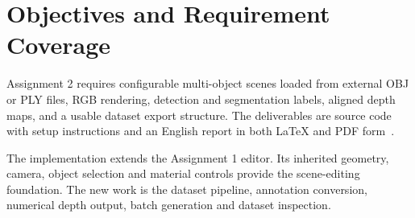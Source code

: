 \documentclass[12pt,a4paper]{article}
\begin{document}
\begin{abstract}
This report describes a C++17 synthetic dataset generator built on a custom OpenGL 3.3 Core and GLSL rendering pipeline. An interactive editor imports OBJ meshes and configures object transforms, materials, lighting and camera pose. The exporter captures aligned RGB images, exact instance identifiers, visible-instance masks, bounding boxes and numerical camera-forward depth. Detection labels are exported in both COCO JSON and YOLO TXT formats; COCO also provides compressed run-length instance segmentation. Seeded batch generation varies scene properties from a fixed base scene and stores replayable scene files. An export dialog renders a preview in memory, while a dataset viewer opens saved samples and reports numerical depth under the cursor. This report explains the architecture, coordinate conventions, annotation algorithms, user workflow, verification results and implementation limits. The reported examples contain eight images, forty visible-object annotations and four categories. No learning-based depth estimation or black-box dataset generator is used.
\end{abstract}
\tableofcontents\clearpage{}

\section{Objectives and Requirement Coverage}
Assignment 2 requires configurable multi-object scenes loaded from external OBJ or PLY files, RGB rendering, detection and segmentation labels, aligned depth maps, and a usable dataset export structure. The deliverables are source code with setup instructions and an English report in both LaTeX and PDF form~\cite{assignment}.

The implementation extends the Assignment 1 editor. Its inherited geometry, camera, object selection and material controls provide the scene-editing foundation. The new work is the dataset pipeline, annotation conversion, numerical depth output, batch generation and dataset inspection.
\end{document}
